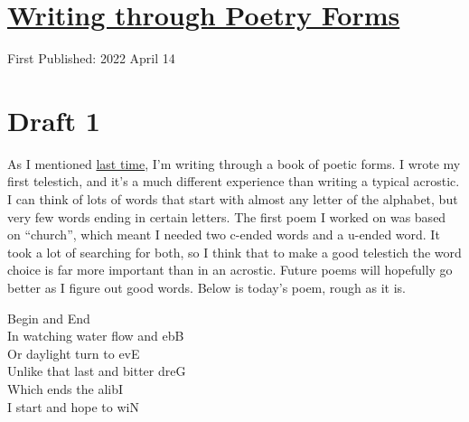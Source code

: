 \documentclass[12pt]{article}[titlepage]
\newcommand{\say}[1]{``#1''}
\newcommand{\1}{\={a}}
\newcommand{\2}{\={e}}
\newcommand{\3}{\={\i}}
\newcommand{\4}{\=o}
\newcommand{\5}{\=u}
\newcommand{\6}{\={A}}
\renewcommand{\,}{\textsuperscript{,}}
\begin{document}
\doublespacing
\section{\href{poetry-forms-2.html}{Writing through Poetry Forms}}
First Published: 2022 April 14


\section{Draft 1}
As I mentioned \href{poetry-forms-1.html}{last time}, I'm writing through a book of poetic forms.
I wrote my first telestich, and it's a much different experience than writing a typical acrostic.
I can think of lots of words that start with almost any letter of the alphabet, but very few words ending in certain letters.
The first poem I worked on was based on \say{church}, which meant I needed two c-ended words and a u-ended word.
It took a lot of searching for both, so I think that to make a good telestich the word choice is far more important than in an acrostic.
Future poems will hopefully go better as I figure out good words.
Below is today's poem, rough as it is.

Begin and End\\
In watching water flow and ebB\\
Or daylight turn to evE\\
Unlike that last and bitter dreG\\
Which ends the alibI\\
I start and hope to wiN
\end{document}
